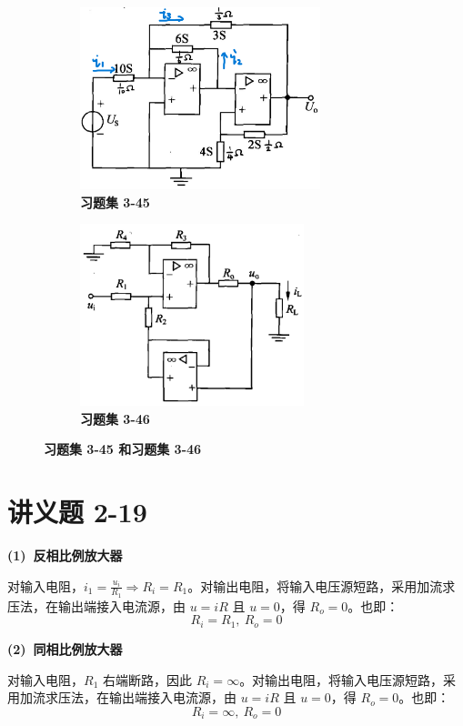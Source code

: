 \documentclass[UTF8]{report}
\theoremstyle{MyLineTheoremStyle} %
\theoremstyle{MyBlockTheoremStyle} %
\theoremstyle{MySubsubsectionStyle} %
\begin{document}
\begin{figure}[H]\centering
    \begin{subfigure}[t]{0.43\textwidth}\centering
        \includegraphics[height=150pt]{assets/3/3-45.png}
        \caption{\bfseries 习题集 3-45 }
    \end{subfigure}\begin{subfigure}[t]{0.43\textwidth}\centering
        \includegraphics[height=150pt]{assets/3/3-46.png}
        \caption{\bfseries 习题集 3-46 }
    \end{subfigure}
    \caption{\bfseries 习题集 3-45 和习题集 3-46 }
    \end{figure}
    


\section{讲义题 2-19}
\textbf{(1)\ 反相比例放大器}

对输入电阻，$i_1 = \frac{u_i}{R_1} \Longrightarrow R_i = R_1$。对输出电阻，将输入电压源短路，采用加流求压法，在输出端接入电流源，由 $u = iR$ 且 $u=0$，得 $R_o = 0$。也即：
\begin{equation}
R_i = R_1,\ R_o = 0
\end{equation}

\textbf{(2)\ 同相比例放大器}

对输入电阻，$R_1$ 右端断路，因此 $R_i = \infty$。对输出电阻，将输入电压源短路，采用加流求压法，在输出端接入电流源，由 $u = iR$ 且 $u=0$，得 $R_o = 0$。也即：
\begin{equation}
R_i = \infty,\ R_o = 0
\end{equation}
\end{document}
